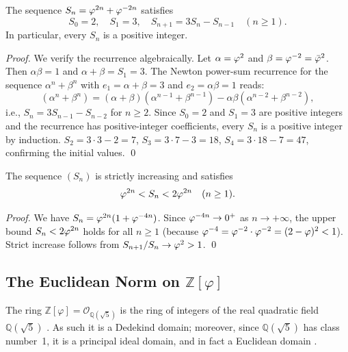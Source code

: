 \begin{theorem}\label{thm:gs-recurrence}
The sequence \(S_n = \varphi^{2n} + \varphi^{-2n}\) satisfies
\[
  S_0 = 2, \quad S_1 = 3, \quad S_{n+1} = 3 S_n - S_{n-1} \quad (n \ge 1) .
\]
In particular, every \(S_n\) is a positive integer.
\end{theorem}

\begin{proof}
We verify the recurrence algebraically.  Let \(\alpha = \varphi^{2}\) and
\(\beta = \varphi^{-2} = \bar\varphi^2\).  Then \(\alpha\beta = 1\) and
\(\alpha + \beta = S_1 = 3\).  The Newton power-sum recurrence for the
sequence \(\alpha^n + \beta^n\) with \(e_1 = \alpha+\beta = 3\) and
\(e_2 = \alpha\beta = 1\) reads:
\[
  (\alpha^n + \beta^n)
  = (\alpha+\beta)(\alpha^{n-1}+\beta^{n-1})
  - \alpha\beta(\alpha^{n-2}+\beta^{n-2}) ,
\]
i.e., \(S_n = 3 S_{n-1} - S_{n-2}\) for \(n \ge 2\).  Since
\(S_0 = 2\) and \(S_1 = 3\) are positive integers and the recurrence
has positive-integer coefficients, every \(S_n\) is a positive integer
by induction.  \(S_2 = 3\cdot3 - 2 = 7\), \(S_3 = 3\cdot7-3 = 18\),
\(S_4 = 3\cdot18-7 = 47\), confirming the initial values.
\qed
\end{proof}

\begin{corollary}\label{cor:gs-growth}
The sequence \((S_n)\) is strictly increasing and satisfies
\[
  \varphi^{2n} < S_n < 2\varphi^{2n} \quad (n \ge 1) .
\]
\end{corollary}

\begin{proof}
We have \(S_n = \varphi^{2n}(1 + \varphi^{-4n})\).  Since
\(\varphi^{-4n} \to 0^+\) as \(n \to +\infty\), the upper bound
\(S_n < 2\varphi^{2n}\) holds for all \(n \ge 1\) (because
\(\varphi^{-4} = \varphi^{-2}\cdot\varphi^{-2} = (2-\varphi)^2 < 1\)).
Strict increase follows from \(S_{n+1}/S_n \to \varphi^{2} > 1\).
\qed
\end{proof}

\subsection{The Euclidean Norm on \(\mathbb{Z}[\varphi]\)}
\label{subsec:gs-euclidean}

The ring \(\mathbb{Z}[\varphi] = \mathcal{O}_{\mathbb{Q}(\sqrt{5})}\)
is the ring of integers of the real quadratic field
\(\mathbb{Q}(\sqrt{5})\) \cite{ireland_rosen}.  As such it is a
Dedekind domain; moreover, since \(\mathbb{Q}(\sqrt{5})\) has class
number~1, it is a principal ideal domain, and in fact a Euclidean
domain \cite{hardy_wright}.


